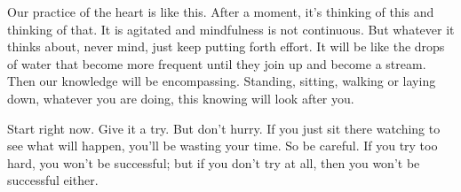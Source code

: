 Our practice of the heart is like this. After a moment, it's thinking of this and thinking of that. It is agitated and mindfulness is not continuous. But whatever it thinks about, never mind, just keep putting forth effort. It will be like the drops of water that become more frequent until they join up and become a stream. Then our knowledge will be encompassing. Standing, sitting, walking or laying down, whatever you are doing, this knowing will look after you.

Start right now. Give it a try. But don't hurry. If you just sit there watching to see what will happen, you'll be wasting your time. So be careful. If you try too hard, you won't be successful; but if you don't try at all, then you won't be successful either.


